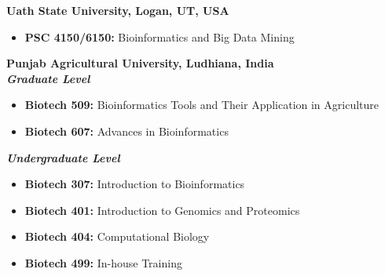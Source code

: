 
\textbf{Uath State University, Logan, UT, USA}
\begin{itemize}

    \item \textbf{PSC 4150/6150:}  Bioinformatics and Big Data Mining

\end{itemize}

\textbf{Punjab Agricultural University, Ludhiana, India}\\[5pt]
\hspace{4pt} \textit{\textbf{Graduate Level}}
\begin{itemize}
    
    \item \textbf{Biotech 509:} Bioinformatics Tools and Their Application in Agriculture
    \item \textbf{Biotech 607:} Advances in Bioinformatics



\end{itemize}
\hspace{4pt} \textit{\textbf{Undergraduate Level}}
\begin{itemize}
\item \textbf{Biotech 307:} Introduction to Bioinformatics
\item \textbf{Biotech 401:} Introduction to Genomics and Proteomics
\item \textbf{Biotech 404:} Computational Biology
\item \textbf{Biotech 499:} In-house Training
\end{itemize}

